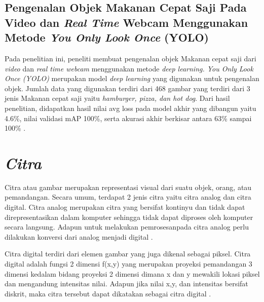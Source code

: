 \subsection{Pengenalan Objek Makanan Cepat Saji Pada Video dan \textit{Real Time} Webcam Menggunakan Metode \textit{You Only Look Once} (YOLO)}
\label{subsec:pengenalanobjekrealtime}
Pada penelitian ini, peneliti membuat pengenalan objek Makanan cepat saji dari \textit{video} dan \textit{real time webcam} menggunakan metode \textit{deep learning. You Only Look Once (YOLO)} merupakan model \textit{deep learning} yang digunakan untuk pengenalan objek. Jumlah data yang digunakan terdiri dari 468 gambar yang terdiri dari 3 jenis Makanan cepat saji yaitu \textit{hamburger, pizza, \textnormal{dan} hot dog}. Dari hasil penelitian, didapatkan hasil nilai avg loss pada model akhir yang dibangun yaitu 4.6\%, nilai validasi mAP 100\%, serta akurasi akhir berkisar antara 63\% sampai 100\% \citep*{karlina2020pengenalan}. \par





\section{\textit{Citra}}
\label{sec:citra}

Citra atau gambar merupakan representasi visual dari suatu objek, orang, atau pemandangan. Secara umum, terdapat 2 jenis citra yaitu citra analog dan citra digital. Citra analog merupakan citra yang bersifat kontinyu dan tidak dapat direpresentasikan dalam komputer sehingga tidak dapat diproses oleh komputer secara langsung. Adapun untuk melakukan pemrosesanpada citra analog perlu dilakukan konversi dari analog menjadi digital \citep*{tyagi2018understanding}. \par

Citra digital terdiri dari elemen gambar yang juga dikenal sebagai piksel. Citra digital adalah fungsi 2 dimensi f(x,y) yang merupakan proyeksi pemandangan 3 dimensi kedalam bidang proyeksi 2 dimensi dimana x dan y mewakili lokasi piksel dan mengandung intensitas nilai. Adapun jika nilai x,y, dan intensitas bersifat diskrit, maka citra tersebut dapat dikatakan sebagai citra digital \citep*{tyagi2018understanding}. \par

